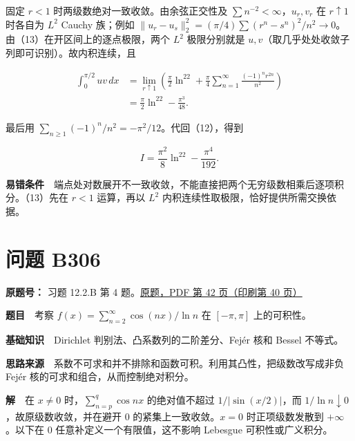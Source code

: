 \documentclass[11pt,a4paper]{article}
\begin{document}
固定 \(r<1\) 时两级数绝对一致收敛。由余弦正交性及
\(\sum n^{-2}<\infty\)，\(u_r,v_r\) 在 \(r\uparrow1\) 时各自为 \(L^2\)
Cauchy 族；例如
\(\|u_r-u_s\|_2^2=(\pi/4)\sum(r^n-s^n)^2/n^2\to0\)。由（13）在开区间上的逐点极限，两个
\(L^2\) 极限分别就是
\(u,v\)（取几乎处处收敛子列即可识别）。故内积连续，且

\begin{equation}
\begin{aligned}
\int_0^{\pi/2}uv\,dx
&=\lim_{r\uparrow1}\left(\frac\pi2\ln^22+
\frac\pi4\sum_{n=1}^{\infty}\frac{(-1)^nr^{2n}}{n^2}\right)\\
&=\frac\pi2\ln^22-\frac{\pi^3}{48}.
\end{aligned}\tag{14}
\end{equation}

最后用 \(\sum_{n\ge1}(-1)^n/n^2=-\pi^2/12\)。代回（12），得到

\begin{equation}
\boxed{I=\frac{\pi^2}{8}\ln^22-\frac{\pi^4}{192}}.
\tag{15}
\end{equation}

\textbf{易错条件}　端点处对数展开不一致收敛，不能直接把两个无穷级数相乘后逐项积分。（13）先在
\(r<1\) 运算，再以 \(L^2\) 内积连续性取极限，恰好提供所需交换依据。

\section{问题 B306}\label{ux95eeux9898-b306}

\textbf{原题号：} 习题 12.2.B 第 4
题。\href{https://zj139.github.io/math-notes/files/problems/楼分析习题-v2.pdf\#page=42}{原题，PDF
第 42 页（印刷第 40 页）}

\textbf{题目}　考察 \(f(x)=\sum_{n=2}^{\infty}\cos(nx)/\ln n\) 在
\([-\pi,\pi]\) 上的可积性。

\textbf{基础知识}　Dirichlet 判别法、凸系数列的二阶差分、Fejér 核和
Bessel 不等式。

\textbf{思路来源}　系数不可求和并不排除和函数可积。利用其凸性，把级数改写成非负
Fejér 核的可求和组合，从而控制绝对积分。

\textbf{解}　在 \(x\ne0\) 时，\(\sum_{n=p}^q\cos nx\) 的绝对值不超过
\(1/|\sin(x/2)|\)，而 \(1/\ln n\downarrow0\)，故原级数收敛，并在避开
\(0\) 的紧集上一致收敛。\(x=0\) 时正项级数发散到 \(+\infty\)。以下在
\(0\) 任意补定义一个有限值，这不影响 Lebesgue 可积性或广义积分。
\end{document}
